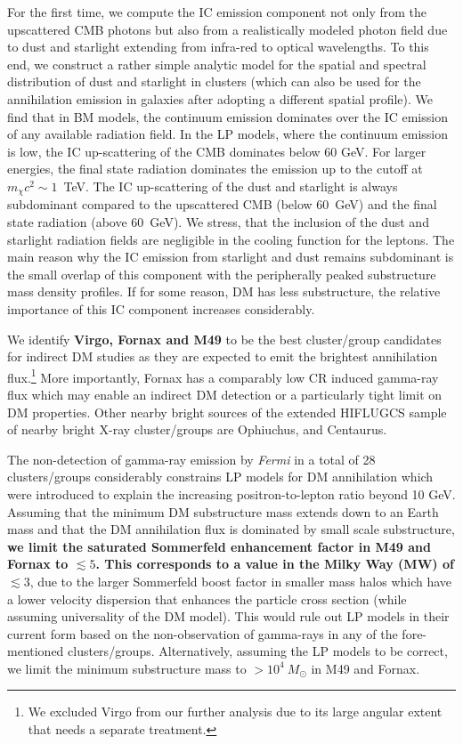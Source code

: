 \documentclass[10pt,aps,pra,reprint,amsmath,amsfonts,amssymb,showpacs,nofootinbib,floatfix]{revtex4-1}
\def\C#1{{\bf #1}}
\newcommand{\Fermi}{{\em Fermi}\xspace}
\newcommand{\msun}{M_\odot}
\begin{document}
For the first time, we compute the IC emission component not only from
the upscattered CMB photons but also from a realistically modeled
photon field due to dust and starlight extending from infra-red to
optical wavelengths. To this end, we construct a rather simple
analytic model for the spatial and spectral distribution of dust and
starlight in clusters (which can also be used for the annihilation
emission in galaxies after adopting a different spatial profile).  We
find that in BM models, the continuum emission dominates over the IC
emission of any available radiation field. In the LP models, where the
continuum emission is low, the IC up-scattering of the CMB dominates
below 60 GeV. For larger energies, the final state radiation dominates
the emission up to the cutoff at $m_\chi c^2 \sim 1$~TeV. The IC
up-scattering of the dust and starlight is always subdominant compared
to the upscattered CMB (below 60~GeV) and the final state radiation
(above 60~GeV).  We stress, that the inclusion of the dust and
starlight radiation fields are negligible in the cooling function for
the leptons.  The main reason why the IC emission from starlight and
dust remains subdominant is the small overlap of this component with
the peripherally peaked substructure mass density profiles. If for
some reason, DM has less substructure, the relative importance of this
IC component increases considerably.

We identify \C{Virgo, Fornax and M49} to be the best cluster/group
candidates for indirect DM studies as they are expected to emit the
brightest annihilation flux.\footnote{We excluded Virgo from our
  further analysis due to its large angular extent that needs a
  separate treatment.}  More importantly, Fornax has a comparably low
CR induced gamma-ray flux which may enable an indirect DM detection or
a particularly tight limit on DM properties.  Other nearby bright
sources of the extended HIFLUGCS sample of nearby bright X-ray
cluster/groups are Ophiuchus, and Centaurus.

The non-detection of gamma-ray emission by \Fermi in a total of 28
clusters/groups considerably constrains LP models for DM annihilation
which were introduced to explain the increasing positron-to-lepton
ratio beyond 10 GeV. Assuming that the minimum DM substructure mass
extends down to an Earth mass and that the DM annihilation flux is
dominated by small scale substructure, \C{we limit the saturated
Sommerfeld enhancement factor in M49 and Fornax to $\lesssim 5$. This
corresponds to a value in the Milky Way (MW) of $\lesssim3$}, due to
the larger Sommerfeld boost factor in smaller mass halos which have a
lower velocity dispersion that enhances the particle cross section
(while assuming universality of the DM model). This would rule out LP
models in their current form based on the non-observation of
gamma-rays in any of the fore-mentioned
clusters/groups. Alternatively, assuming the LP models to be correct,
we limit the minimum substructure mass to $>10^4~\msun$ in M49 and
Fornax.
\end{document}
